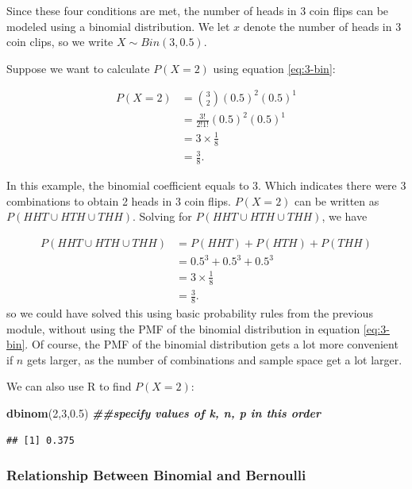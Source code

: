 \documentclass[
]{book}
\newenvironment{Shaded}{\begin{snugshade}}{\end{snugshade}}
\newcommand{\DecValTok}[1]{\textcolor[rgb]{0.00,0.00,0.81}{#1}}
\newcommand{\DocumentationTok}[1]{\textcolor[rgb]{0.56,0.35,0.01}{\textbf{\textit{#1}}}}
\newcommand{\FloatTok}[1]{\textcolor[rgb]{0.00,0.00,0.81}{#1}}
\newcommand{\FunctionTok}[1]{\textcolor[rgb]{0.13,0.29,0.53}{\textbf{#1}}}
\newcommand{\NormalTok}[1]{#1}
\begin{document}
Since these four conditions are met, the number of heads in 3 coin flips can be modeled using a binomial distribution. We let \(x\) denote the number of heads in 3 coin clips, so we write \(X \sim Bin(3,0.5)\).

Suppose we want to calculate \(P(X=2)\) using equation \eqref{eq:3-bin}:

\[
\begin{split}
P(X=2) &= \binom{3}{2} (0.5)^2 (0.5)^1\\
       &= \frac{3!}{2! 1!} (0.5)^2 (0.5)^1 \\
       &= 3 \times \frac{1}{8} \\
       &= \frac{3}{8}.
\end{split}
\]

In this example, the binomial coefficient equals to 3. Which indicates there were 3 combinations to obtain 2 heads in 3 coin flips. \(P(X=2)\) can be written as \(P(HHT \cup HTH \cup THH)\). Solving for \(P(HHT \cup HTH \cup THH)\), we have

\[
\begin{split}
P(HHT \cup HTH \cup THH) &= P(HHT) + P(HTH) + P(THH)\\
       &= 0.5^3 + 0.5^3 + 0.5^3 \\
       &= 3 \times \frac{1}{8} \\
       &= \frac{3}{8}.
\end{split}
\]
so we could have solved this using basic probability rules from the previous module, without using the PMF of the binomial distribution in equation \eqref{eq:3-bin}. Of course, the PMF of the binomial distribution gets a lot more convenient if \(n\) gets larger, as the number of combinations and sample space get a lot larger.

We can also use R to find \(P(X=2)\):

\begin{Shaded}
\begin{Highlighting}[]
\FunctionTok{dbinom}\NormalTok{(}\DecValTok{2}\NormalTok{,}\DecValTok{3}\NormalTok{,}\FloatTok{0.5}\NormalTok{) }\DocumentationTok{\#\#specify values of k, n, p in this order}
\end{Highlighting}
\end{Shaded}

\begin{verbatim}
## [1] 0.375
\end{verbatim}

\hypertarget{relationship-between-binomial-and-bernoulli}{%
\subsubsection{Relationship Between Binomial and Bernoulli}\label{relationship-between-binomial-and-bernoulli}}
\end{document}
